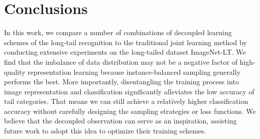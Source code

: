 \documentclass{article}
\begin{document}
\section{Conclusions}

In this work, we compare a number of combinations of decoupled learning schemes of the long-tail recognition to the traditional joint learning method by conducting extensive experiments on the long-tailed dataset ImageNet-LT. We find that the imbalance of data distribution may not be a negative factor of high-quality representation learning because instance-balanced sampling generally performs the best. More importantly, disentangling the training process into image representation and classification significantly alleviates the low accuracy of tail categories. That means we can still achieve a relatively higher classification accuracy without carefully designing the sampling strategies or loss functions. We believe that the decoupled observation can serve as an inspiration, assisting future work to adopt this idea to optimize their training schemes.


{
\small


}
\end{document}
